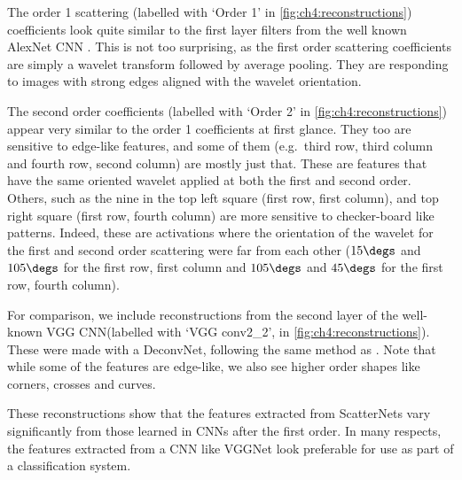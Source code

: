 The order 1 scattering (labelled with `Order 1' in
\autoref{fig:ch4:reconstructions}) coefficients look quite similar to the first
layer filters from the well known AlexNet CNN \cite{krizhevsky_imagenet_2012}.
This is not too surprising, as the first order scattering coefficients are
simply a wavelet transform followed by average pooling. They are responding to
images with strong edges aligned with the wavelet orientation. 

The second order coefficients (labelled with `Order
2' in \autoref{fig:ch4:reconstructions}) appear very similar to the order
1 coefficients at first glance.
They too are sensitive to edge-like features, and some of them (e.g.\ third row,
third column and fourth row, second column) are mostly just that. These are
features that have the same oriented wavelet applied at both the first and
second order.  Others, such as the nine in the top left square (first row, first column), 
and top right square (first row, fourth column) are more sensitive to
checker-board like patterns. Indeed, these are activations where the orientation
of the wavelet for the first and second order scattering were far from each
other ($15\degs$ and $105\degs$ for the first row, first column and $105\degs$
and $45\degs$ for the first row, fourth column).

For comparison, we include reconstructions from the second layer of the
well-known VGG CNN\@ (labelled with `VGG conv2\_2', in
\autoref{fig:ch4:reconstructions}). These were made with a DeconvNet, following the
same method as \cite{zeiler_visualizing_2014}. Note that while some of
the features are edge-like, we also see higher order shapes like corners,
crosses and curves.

These reconstructions show that the features extracted from ScatterNets vary
significantly from those learned in CNNs after the first order. In many
respects, the features extracted from a CNN like VGGNet look preferable for use
as part of a classification system.

